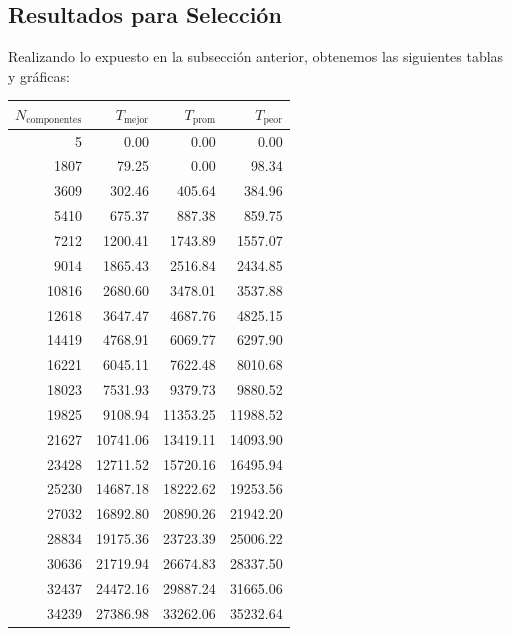\documentclass{homework}
\begin{document}
    \subsection{Resultados para Selección}

    Realizando lo expuesto en la subsección anterior, obtenemos las siguientes tablas y gráficas:

    \begin{table}[H] 
        \footnotesize
        \centering 
        \begin{tabular}{|r|r|r|r|} 
                \hline
                $N_{\text{componentes}}$ & $T_{\text{mejor}}$ & $T_{\text{prom}}$ & $T_{\text{peor}}$ \\
                \hline 
                5 & 0.00 & 0.00 & 0.00 \\ 
                1807 & 79.25 & 0.00 & 98.34 \\ 
                3609 & 302.46 & 405.64 & 384.96 \\ 
                5410 & 675.37 & 887.38 & 859.75 \\ 
                7212 & 1200.41 & 1743.89 & 1557.07 \\ 
                9014 & 1865.43 & 2516.84 & 2434.85 \\ 
                10816 & 2680.60 & 3478.01 & 3537.88 \\ 
                12618 & 3647.47 & 4687.76 & 4825.15 \\ 
                14419 & 4768.91 & 6069.77 & 6297.90 \\ 
                16221 & 6045.11 & 7622.48 & 8010.68 \\ 
                18023 & 7531.93 & 9379.73 & 9880.52 \\ 
                19825 & 9108.94 & 11353.25 & 11988.52 \\ 
                21627 & 10741.06 & 13419.11 & 14093.90 \\ 
                23428 & 12711.52 & 15720.16 & 16495.94 \\ 
                25230 & 14687.18 & 18222.62 & 19253.56 \\ 
                27032 & 16892.80 & 20890.26 & 21942.20 \\ 
                28834 & 19175.36 & 23723.39 & 25006.22 \\ 
                30636 & 21719.94 & 26674.83 & 28337.50 \\ 
                32437 & 24472.16 & 29887.24 & 31665.06 \\ 
                34239 & 27386.98 & 33262.06 & 35232.64 \\ 

\end{tabular}
\end{table}
\end{document}
